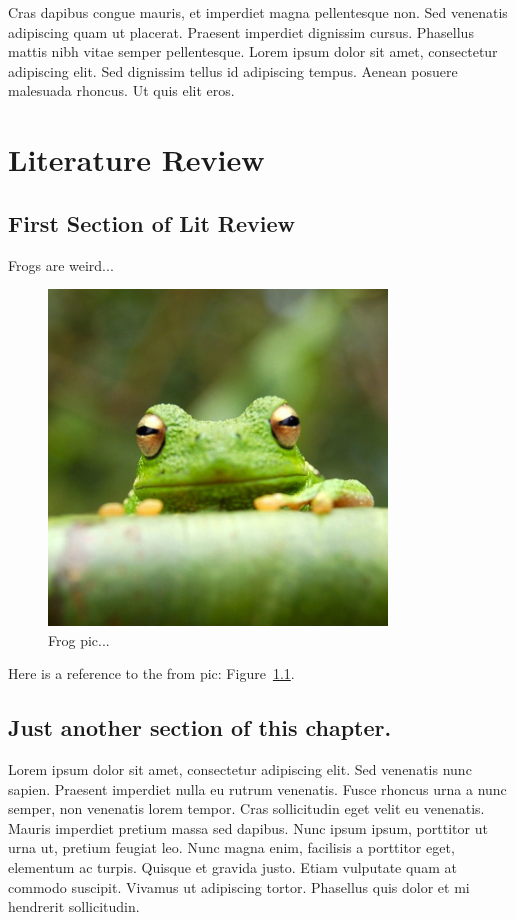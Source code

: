 \documentclass[double,12pt]{beavtex}
\begin{document}
Cras dapibus congue mauris, et imperdiet magna pellentesque non. Sed venenatis adipiscing quam ut placerat. Praesent imperdiet dignissim cursus. Phasellus mattis nibh vitae semper pellentesque. Lorem ipsum dolor sit amet, consectetur adipiscing elit. Sed dignissim tellus id adipiscing tempus. Aenean posuere malesuada rhoncus. Ut quis elit eros.




\chapter{Literature Review}

\section{First Section of Lit Review}

Frogs are weird...

\begin{figure}[ht!]
\begin{center}
	\includegraphics[width=9cm]{frog.jpg}
	\caption{Frog pic...}
	\label{fig:frog}
	\end{center}
\end{figure}


Here is a reference to the from pic: Figure~\ref{fig:frog}.

\section{Just another section of this chapter.}

Lorem ipsum dolor sit amet, consectetur adipiscing elit. Sed venenatis nunc sapien. Praesent imperdiet nulla eu rutrum venenatis. Fusce rhoncus urna a nunc semper, non venenatis lorem tempor. Cras sollicitudin eget velit eu venenatis. Mauris imperdiet pretium massa sed dapibus. Nunc ipsum ipsum, porttitor ut urna ut, pretium feugiat leo. Nunc magna enim, facilisis a porttitor eget, elementum ac turpis. Quisque et gravida justo. Etiam vulputate quam at commodo suscipit. Vivamus ut adipiscing tortor. Phasellus quis dolor et mi hendrerit sollicitudin. 
\end{document}
